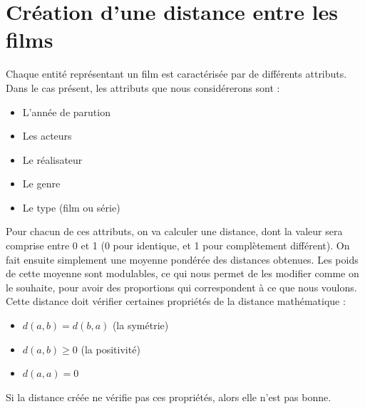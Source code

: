 \documentclass[11pt,a4paper]{report}
\begin{document}


\section{Création d'une distance entre les films}

Chaque entité représentant un film est caractérisée par de différents attributs. Dans le cas présent, les attributs que nous considérerons sont :
\begin{itemize}
    \item L'année de parution
    \item Les acteurs
    \item Le réalisateur
    \item Le genre
    \item Le type (film ou série)
\end{itemize}

Pour chacun de ces attributs, on va calculer une distance, dont la valeur sera comprise entre 0 et 1 (0 pour identique, et 1 pour complètement différent). On fait ensuite simplement une moyenne pondérée des distances obtenues. Les poids de cette moyenne sont modulables, ce qui nous permet de les modifier comme on le souhaite, pour avoir des proportions qui correspondent à ce que nous voulons.\\
Cette distance doit vérifier certaines propriétés de la distance mathématique :
\begin{itemize}
    \item \(d(a,b)=d(b,a)\) (la symétrie)
    \item \(d(a,b) \geq 0\) (la positivité)
    \item \(d(a,a)=0\)
\end{itemize}
Si la distance créée ne vérifie pas ces propriétés, alors elle n'est pas bonne.
\end{document}
